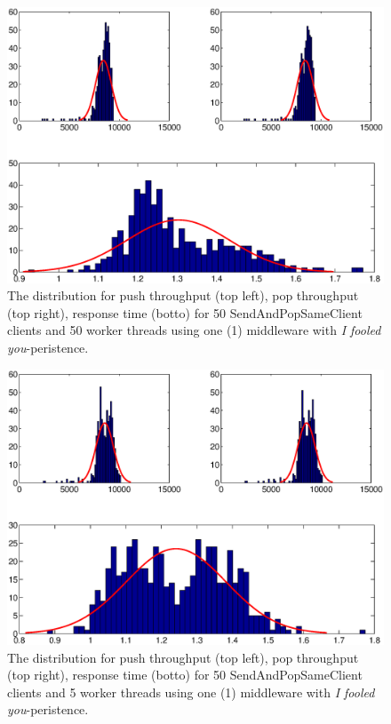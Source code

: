 \documentclass{article}
\begin{document}
\begin{table}
\begin{tabular}
        
        \begin{figure}[hbtp]
        \centering
        \includegraphics[scale=1]{img/histfit_i_fooled_you_50_thrds}
        \caption{The distribution for push throughput (top left), pop throughput (top right), response time (botto) for 50 SendAndPopSameClient clients and 50 worker threads using one (1) middleware with \textit{I fooled you}-peristence.}
        \end{figure}
        
        \begin{figure}[hbtp]
        \centering
        \includegraphics[scale=0.7]{img/histfit_i_fooled_you_5_thrds}
        \caption{The distribution for push throughput (top left), pop throughput (top right), response time (botto) for 50 SendAndPopSameClient clients and 5 worker threads using one (1) middleware with \textit{I fooled you}-peristence.}
        \end{figure}
        

\end{tabular}
\end{table}
\end{document}
